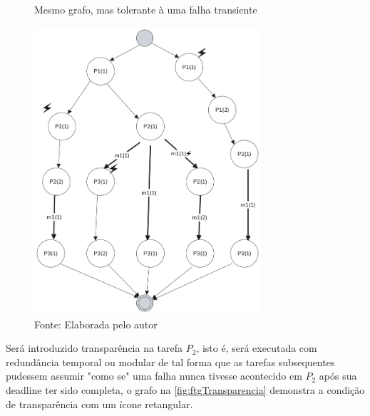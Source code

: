 \begin{figure}[H]
    \centering
    \captionsetup{justification=centering}
    \caption{Mesmo grafo, mas tolerante à uma falha transiente}
    \includegraphics[width=0.75\textwidth]{assets/ftg_expandido.png}
    \captionsetup{justification=raggedright}
    \caption*{Fonte: Elaborada pelo autor}
    \label{fig:ftgExpandido}
\end{figure}

Será introduzido transparência na tarefa $P_2$, isto é, será executada com redundância temporal ou modular de tal forma que as tarefas subsequentes pudessem assumir "como se" uma falha nunca tivesse acontecido em $P_2$ após sua deadline ter sido completa, o grafo na \autoref{fig:ftgTransparencia} demonstra a condição de transparência com um ícone retangular.

